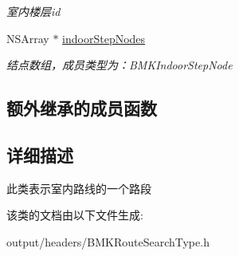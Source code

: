 \begin{DoxyCompactItemize}
\begin{DoxyCompactList}\small\item\em 室内楼层id \end{DoxyCompactList}\item 
\hypertarget{interface_b_m_k_indoor_route_step_af7bdad4c28e27e7511457d3ad3b1d0a8}{}N\+S\+Array $\ast$ \hyperlink{interface_b_m_k_indoor_route_step_af7bdad4c28e27e7511457d3ad3b1d0a8}{indoor\+Step\+Nodes}\label{interface_b_m_k_indoor_route_step_af7bdad4c28e27e7511457d3ad3b1d0a8}

\begin{DoxyCompactList}\small\item\em 结点数组，成员类型为：\+B\+M\+K\+Indoor\+Step\+Node \end{DoxyCompactList}\end{DoxyCompactItemize}
\subsection*{额外继承的成员函数}


\subsection{详细描述}
此类表示室内路线的一个路段 

该类的文档由以下文件生成\+:\begin{DoxyCompactItemize}
\item 
output/headers/B\+M\+K\+Route\+Search\+Type.\+h\end{DoxyCompactItemize}
